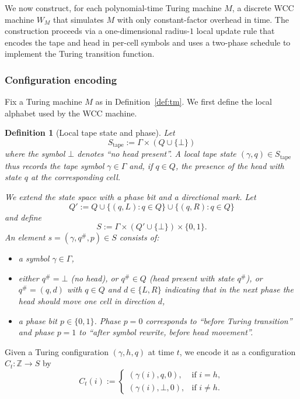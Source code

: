 \documentclass[12pt]{article}
\newtheorem{definition}[theorem]{Definition}
\begin{document}
We now construct, for each polynomial-time Turing machine $M$, a discrete WCC
machine $W_M$ that simulates $M$ with only constant-factor overhead in time. The
construction proceeds via a one-dimensional radius-$1$ local update rule that
encodes the tape and head in per-cell symbols and uses a two-phase schedule to
implement the Turing transition function.

\subsubsection{Configuration encoding}

Fix a Turing machine $M$ as in Definition~\ref{def:tm}. We first define the
local alphabet used by the WCC machine.

\begin{definition}[Local tape state and phase]
\label{def:local_state}
Let
\[
S_{\mathrm{tape}} := \Gamma \times (Q \cup \{\bot\})
\]
where the symbol $\bot$ denotes ``no head present''. A local tape state
$(\gamma,q) \in S_{\mathrm{tape}}$ thus records the tape symbol $\gamma \in
\Gamma$ and, if $q \in Q$, the presence of the head with state $q$ at the
corresponding cell.

We extend the state space with a phase bit and a directional mark. Let
\[
Q' := Q \cup \{(q,L) : q \in Q\} \cup \{(q,R) : q \in Q\}
\]
and define
\[
S := \Gamma \times (Q' \cup \{\bot\}) \times \{0,1\}.
\]
An element $s = (\gamma, q^\#, p) \in S$ consists of:
\begin{itemize}
  \item a symbol $\gamma \in \Gamma$,
  \item either $q^\# = \bot$ (no head), or $q^\# \in Q$ (head present with
    state $q^\#$), or $q^\# = (q,d)$ with $q \in Q$ and $d \in \{L,R\}$
    indicating that in the next phase the head should move one cell in
    direction $d$,
  \item a phase bit $p \in \{0,1\}$. Phase $p=0$ corresponds to ``before Turing
    transition'' and phase $p=1$ to ``after symbol rewrite, before head
    movement''.
\end{itemize}
\end{definition}

Given a Turing configuration $(\gamma, h, q)$ at time $t$, we encode it as a
configuration $C_t : \mathbb{Z} \to S$ by
\[
C_t(i) :=
\begin{cases}
(\gamma(i), q, 0), & \text{if } i = h,\\[2pt]
(\gamma(i), \bot, 0), & \text{if } i \neq h.
\end{cases}
\]
\end{document}
